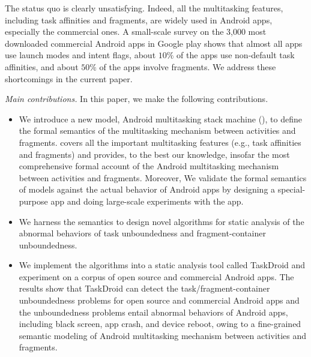 The status quo is clearly unsatisfying. 
Indeed, all the multitasking features, including task affinities and fragments, are widely used in Android apps, especially the commercial ones. A small-scale survey on the 3,000 most downloaded commercial Android apps in Google play shows that almost all apps use launch modes and intent flags, about $10\%$ of the apps use non-default task affinities, and  about $50\%$ of the apps involve fragments. 
We address these shortcomings in the current paper. %
%

\medskip
\noindent\emph{Main contributions.} In this paper, we make the following contributions. %
\begin{itemize}
\item We introduce a new model, Android multitasking stack machine (\AMASS), to define the formal semantics of the multitasking mechanism between activities and fragments. {\AMASS} covers all the important multitasking features (e.g., task affinities and fragments) and provides, to the best  our knowledge, insofar the most comprehensive formal account of the Android multitasking mechanism between activities and fragments. Moreover, We validate the formal semantics of {\AMASS} models against the actual behavior of  Android apps by designing a special-purpose app and doing large-scale experiments with the app. 
%
\item We harness the semantics to design novel algorithms for static analysis of the abnormal behaviors of task unboundedness and fragment-container unboundedness. %

\item We implement the algorithms into a static analysis tool called TaskDroid and experiment on a corpus of open source and commercial Android apps.  
The results show that TaskDroid can detect the task/fragment-container unboundedness problems for open source and commercial Android apps and the unboundedness problems entail abnormal behaviors of Android apps, including black screen, app crash, and device reboot, owing to a fine-grained semantic modeling of Android multitasking mechanism between activities and fragments.  %
\end{itemize}

